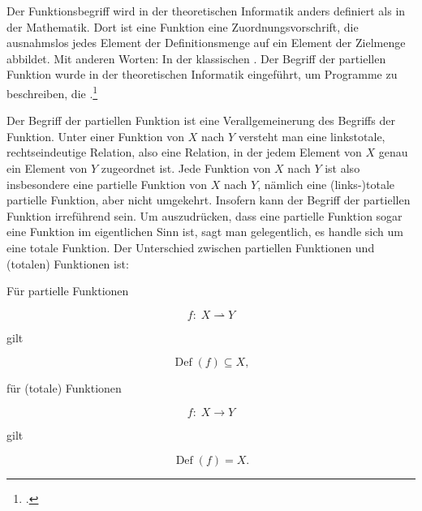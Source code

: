 \documentclass{lehramt-informatik-haupt}
\begin{document}
Der Funktionsbegriff wird in der theoretischen Informatik anders
definiert als in der Mathematik. Dort ist eine Funktion eine
Zuordnungsvorschrift, die ausnahmslos jedes Element der Definitionsmenge
auf ein Element der Zielmenge abbildet. Mit anderen Worten: In der
klassischen . Der Begriff
der partiellen Funktion wurde in der theoretischen Informatik
eingeführt, um Programme zu beschreiben, die .\footcite[Seite 51]{hoffmann}

Der Begriff der partiellen Funktion ist eine Verallgemeinerung des
Begriffs der Funktion. Unter einer Funktion von $X$ nach $Y$ versteht
man eine linkstotale, rechtseindeutige Relation, also eine Relation, in
der jedem Element von $X$ genau ein Element von $Y$ zugeordnet ist. Jede
Funktion von $X$ nach $Y$ ist also insbesondere eine partielle Funktion
von $X$ nach $Y$, nämlich eine (links-)totale partielle Funktion, aber
nicht umgekehrt. Insofern kann der Begriff der partiellen Funktion
irreführend sein. Um auszudrücken, dass eine partielle Funktion sogar
eine Funktion im eigentlichen Sinn ist, sagt man gelegentlich, es handle
sich um eine totale Funktion. Der Unterschied zwischen partiellen
Funktionen und (totalen) Funktionen ist:

\noindent
Für partielle Funktionen

\begin{displaymath}
f\colon \;X \rightharpoonup Y
\end{displaymath}

\noindent
gilt

\begin{displaymath}
\operatorname {Def} (f) \subseteq X ,
\end{displaymath}

\noindent
für (totale) Funktionen

\begin{displaymath}
f \colon \; X \to Y
\end{displaymath}

\noindent
gilt

\begin{displaymath}
\operatorname {Def} (f)=X .
\end{displaymath}


\end{document}

